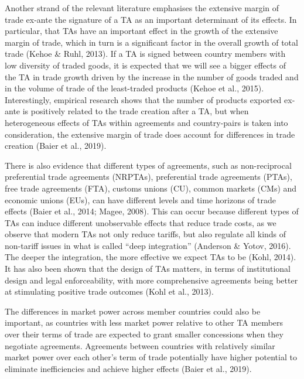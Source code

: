 \documentclass[12pt]{article}%
\begin{document}
Another strand of the relevant literature emphasises the extensive
margin of trade ex-ante the signature of a TA as an important
determinant of its effects. In particular, that TAs have an important
effect in the growth of the extensive margin of trade, which in turn is
a significant factor in the overall growth of total trade (Kehoe \&
Ruhl, 2013). If a TA is signed between country members with low
diversity of traded goods, it is expected that we will see a bigger
effects of the TA in trade growth driven by the increase in the number
of goods traded and in the volume of trade of the least-traded products
(Kehoe et al., 2015). Interestingly, empirical research shows that the
number of products exported ex-ante is positively related to the trade
creation after a TA, but when heterogeneous effects of TAs within
agreements and country-pairs is taken into consideration, the extensive
margin of trade does account for differences in trade creation (Baier et
al., 2019).

There is also evidence that different types of agreements, such as
non-reciprocal preferential trade agreements (NRPTAs), preferential
trade agreements (PTAs), free trade agreements (FTA), customs unions
(CU), common markets (CMs) and economic unions (EUs), can have different
levels and time horizons of trade effects (Baier et al., 2014; Magee,
2008). This can occur because different types of TAs can induce
different unobservable effects that reduce trade costs, as we observe
that modern TAs not only reduce tariffs, but also regulate all kinds of
non-tariff issues in what is called ``deep integration'' (Anderson \&
Yotov, 2016). The deeper the integration, the more effective we expect
TAs to be (Kohl, 2014). It has also been shown that the design of TAs
matters, in terms of institutional design and legal enforceability, with
more comprehensive agreements being better at stimulating positive trade
outcomes (Kohl et al., 2013).

The differences in market power across member countries could also be
important, as countries with less market power relative to other TA
members over their terms of trade are expected to grant smaller
concessions when they negotiate agreements. Agreements between countries
with relatively similar market power over each other's term of trade
potentially have higher potential to eliminate inefficiencies and
achieve higher effects (Baier et al., 2019).
\end{document}
